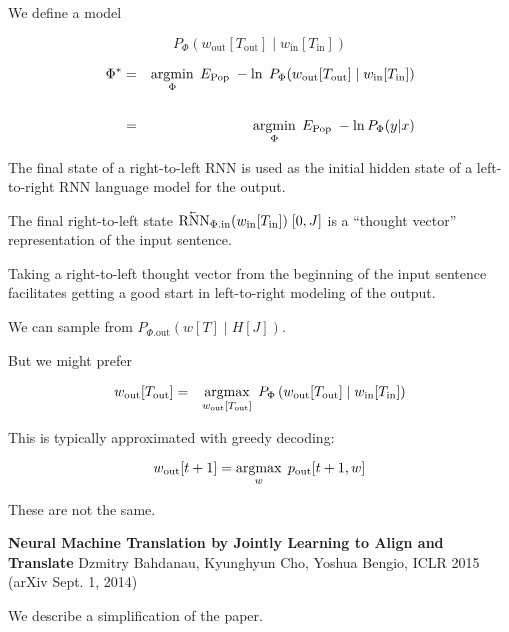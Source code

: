 {\vfill
We define a model

\vfill
$$P_\Phi\left(w_{\mathrm{out}}[T_{\mathrm{out}}]\;|\; w_{\mathrm{in}}[T_\mathrm{in}]\right)$$

\vfill
\begin{eqnarray*}
\Phi^*  & = & \operatorname*{argmin}_\Phi\; E_{\mathrm{Pop}} \;-\ln\;P_\Phi(w_{\mathrm{out}}[T_{\mathrm{out}}] \;|\; w_{\mathrm{in}}[T_{\mathrm{in}}]) \\
\\
& = & \operatorname*{argmin}_\Phi \; E_{\mathrm{Pop}} \; -\ln P_\Phi(y|x)
\end{eqnarray*}



\vfill
The final state of a right-to-left RNN is used as the initial hidden state of a left-to-right RNN language model for the output.

\vfill
The final right-to-left state {\color{red} $\cev{\mathrm{RNN}}_{\Phi.\mathrm{in}}(w_{\mathrm{in}}[T_{\mathrm{in}}])\;[0,J]$} is a ``thought vector'' representation of the input sentence.

\vfill
Taking a right-to-left thought vector from the beginning of the input sentence facilitates getting a good start in left-to-right modeling of the output.


We can sample from $P_{\Phi.\mathrm{out}}(w[T]\;|\;H[J])$.

\vfill
But we might prefer

\begin{eqnarray*}
w_{\mathrm{out}}[T_{\mathrm{out}}]
& = & \operatorname*{argmax}_{w_{\mathrm{out}}[T_{\mathrm{out}}]} \;P_\Phi\left(w_{\mathrm{out}}[T_{\mathrm{out}}] \;|\; w_{\mathrm{in}}[T_{\mathrm{in}}] \right)
\end{eqnarray*}

\vfill
This is typically approximated with greedy decoding:

\vfill
$$w_{\mathrm{out}}[t+1] = \operatorname*{argmax}_w\; p_{\mathrm{out}}[t+1,w]$$

\vfill
These are not the same.


{\bf Neural Machine Translation by Jointly Learning to {\color{red} Align} and Translate}
Dzmitry Bahdanau, Kyunghyun Cho, Yoshua Bengio, ICLR 2015 (arXiv Sept. 1, 2014)

\vfill
We describe a simplification of the paper.


}
